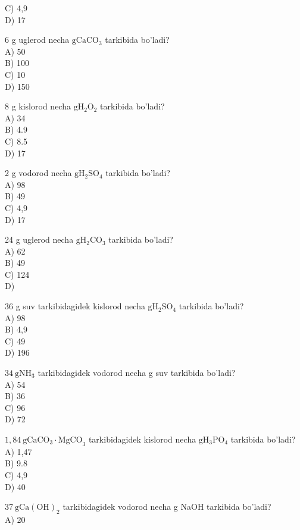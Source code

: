 C) 4,9\\
D) 17
  \item 6 g uglerod necha $\mathrm{g} \mathrm{CaCO}_{3}$ tarkibida bo'ladi?\\
A) 50\\
B) 100\\
C) 10\\
D) 150
  \item 8 g kislorod necha $\mathrm{g} \mathrm{H}_{2} \mathrm{O}_{2}$ tarkibida bo'ladi?\\
A) 34\\
B) 4.9\\
C) 8.5\\
D) 17
  \item 2 g vodorod necha $\mathrm{g} \mathrm{H}_{2} \mathrm{SO}_{4}$ tarkibida bo'ladi?\\
A) 98\\
B) 49\\
C) 4,9\\
D) 17
  \item 24 g uglerod necha $\mathrm{g} \mathrm{H}_{2} \mathrm{CO}_{3}$ tarkibida bo'ladi?\\
A) 62\\
B) 49\\
C) 124\\
D)
  \item 36 g suv tarkibidagidek kislorod necha $\mathrm{g} \mathrm{H}_{2} \mathrm{SO}_{4}$ tarkibida bo'ladi?\\
A) 98\\
B) 4,9\\
C) 49\\
D) 196
  \item $34 \mathrm{~g} \mathrm{NH}_{3}$ tarkibidagidek vodorod necha g suv tarkibida bo'ladi?\\
A) 54\\
B) 36\\
C) 96\\
D) 72
  \item $1,84 \mathrm{~g} \mathrm{CaCO}_{3} \cdot \mathrm{MgCO}_{3}$ tarkibidagidek kislorod necha $\mathrm{g} \mathrm{H}_{3} \mathrm{PO}_{4}$ tarkibida bo'ladi?\\
A) 1,47\\
B) 9.8\\
C) 4,9\\
D) 40
  \item $37 \mathrm{~g} \mathrm{Ca}(\mathrm{OH})_{2}$ tarkibidagidek vodorod necha g NaOH tarkibida bo'ladi?\\
A) 20\\
